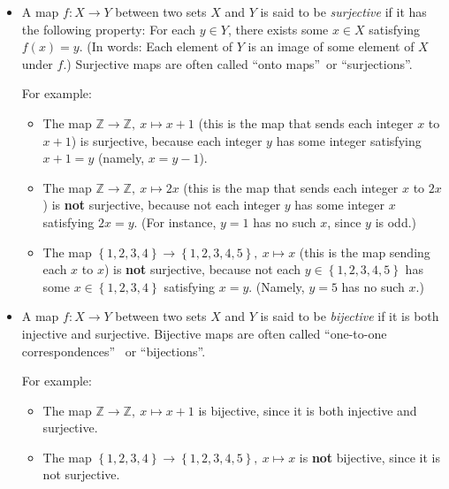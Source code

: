 \documentclass[numbers=enddot,12pt,final,onecolumn,notitlepage]{scrartcl}%
\theoremstyle{definition}
\begin{document}
\begin{itemize}
\item A map $f:X\rightarrow Y$ between two sets $X$ and $Y$ is said to be
\textit{surjective} if it has the following property: For each $y\in Y$, there
exists some $x\in X$ satisfying $f\left(  x\right)  =y$. (In words: Each
element of $Y$ is an image of some element of $X$ under $f$.) Surjective maps
are often called \textquotedblleft onto maps\textquotedblright\ or
\textquotedblleft surjections\textquotedblright.

For example:

\begin{itemize}
\item The map $\mathbb{Z}\rightarrow\mathbb{Z},\ x\mapsto x+1$ (this is the
map that sends each integer $x$ to $x+1$) is surjective, because each integer
$y$ has some integer satisfying $x+1=y$ (namely, $x=y-1$).

\item The map $\mathbb{Z}\rightarrow\mathbb{Z},\ x\mapsto2x$ (this is the map
that sends each integer $x$ to $2x$) is \textbf{not} surjective, because not
each integer $y$ has some integer $x$ satisfying $2x=y$. (For instance, $y=1$
has no such $x$, since $y$ is odd.)

\item The map $\left\{  1,2,3,4\right\}  \rightarrow\left\{
1,2,3,4,5\right\}  ,\ x\mapsto x$ (this is the map sending each $x$ to $x$) is
\textbf{not} surjective, because not each $y\in\left\{  1,2,3,4,5\right\}  $
has some $x\in\left\{  1,2,3,4\right\}  $ satisfying $x=y$. (Namely, $y=5$ has
no such $x$.)
\end{itemize}

\item A map $f:X\rightarrow Y$ between two sets $X$ and $Y$ is said to be
\textit{bijective} if it is both injective and surjective. Bijective maps are
often called \textquotedblleft one-to-one correspondences\textquotedblright%
\ or \textquotedblleft bijections\textquotedblright.

For example:

\begin{itemize}
\item The map $\mathbb{Z}\rightarrow\mathbb{Z},\ x\mapsto x+1$ is bijective,
since it is both injective and surjective.

\item The map $\left\{  1,2,3,4\right\}  \rightarrow\left\{
1,2,3,4,5\right\}  ,\ x\mapsto x$ is \textbf{not} bijective, since it is not surjective.


\end{itemize}
\end{itemize}
\end{document}
